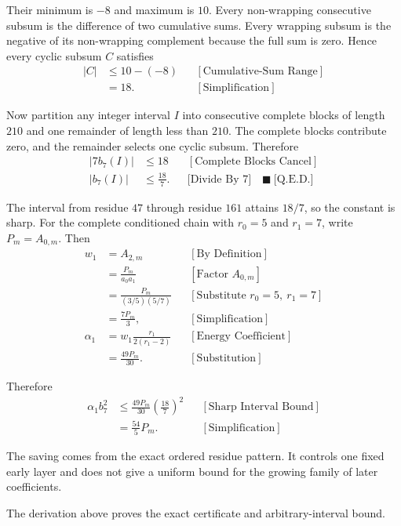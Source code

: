 Their minimum is $-8$ and maximum is $10$. Every non-wrapping consecutive
subsum is the difference of two cumulative sums. Every wrapping subsum is the
negative of its non-wrapping complement because the full sum is zero. Hence
every cyclic subsum $C$ satisfies
\begin{equation*}
\begin{aligned}
|C|
&\le10-(-8)
&&[\text{Cumulative-Sum Range}]\\
&=18.
&&[\text{Simplification}]
\end{aligned}
\end{equation*}

Now partition any integer interval $I$ into consecutive complete blocks of
length $210$ and one remainder of length less than $210$. The complete blocks
contribute zero, and the remainder selects one cyclic subsum. Therefore
\begin{equation*}
\begin{aligned}
|7b_7(I)|&\le18
&&[\text{Complete Blocks Cancel}]\\
|b_7(I)|&\le\frac{18}{7}.
&&\text{[Divide By }7\text{]}\quad\blacksquare\ \text{[Q.E.D.]}
\end{aligned}
\end{equation*}

The interval from residue $47$ through residue $161$ attains $18/7$, so the
constant is sharp. For the complete conditioned chain with
$r_0=5$ and $r_1=7$, write $P_m=A_{0,m}$. Then
\begin{equation*}
\begin{aligned}
w_1
&=A_{2,m}
&&[\text{By Definition}]\\
&=\frac{P_m}{a_0a_1}
&&[\text{Factor }A_{0,m}]\\
&=\frac{P_m}{(3/5)(5/7)}
&&[\text{Substitute }r_0=5,\ r_1=7]\\
&=\frac{7P_m}{3},
&&[\text{Simplification}]\\
\alpha_1
&=w_1\frac{r_1}{2(r_1-2)}
&&[\text{Energy Coefficient}]\\
&=\frac{49P_m}{30}.
&&[\text{Substitution}]
\end{aligned}
\end{equation*}

Therefore
\begin{equation*}
\begin{aligned}
\alpha_1b_7^2
&\le\frac{49P_m}{30}\left(\frac{18}{7}\right)^2
&&[\text{Sharp Interval Bound}]\\
&=\frac{54}{5}P_m.
&&[\text{Simplification}]
\end{aligned}
\end{equation*}

The saving comes from the exact ordered residue pattern. It controls one
fixed early layer and does not give a uniform bound for the growing family of
later coefficients.

{\raggedright
The derivation above proves the exact certificate and arbitrary-interval
bound. \par}

